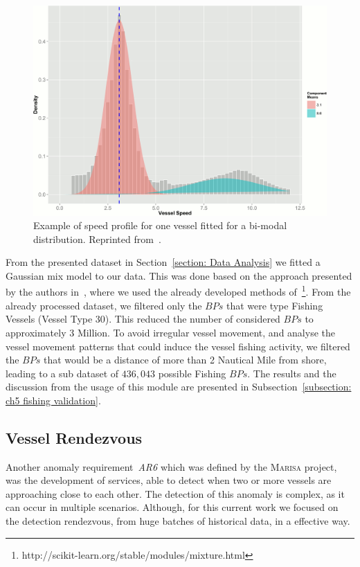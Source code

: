 \begin{figure}[H]
\centering
\includegraphics[scale = .7]{figures/Ch4/gmm_example.png}
\caption{Example of speed profile for one vessel fitted for a bi-modal distribution. Reprinted from~\cite{Natale2015MappingData}.}
\label{fig: 4 gmm_example}
\end{figure}

 
From the presented dataset in Section~\ref{section: Data Analysis} we fitted a Gaussian mix model to our data. This was done based on the approach presented by the authors in~\cite{Natale2015MappingData},  where we used the already developed methods of~\footnote{http://scikit-learn.org/stable/modules/mixture.html}. From the already  processed dataset, we filtered only the $BPs$ that were type Fishing Vessels (Vessel Type 30). This reduced the number of considered $BPs$ to approximately 3 Million. To avoid irregular vessel movement, and analyse the vessel movement patterns that could induce the vessel fishing activity, we filtered the $BPs$ that would be a distance of more than 2 Nautical Mile from shore, leading to a sub dataset of $436,043$ possible Fishing $BPs$.
The results and the discussion from the usage of this module are presented in Subsection~\ref{subsection: ch5 fishing validation}.

\subsection{Vessel Rendezvous}
\label{subsection: 4 Vessel Rendezvous}
Another anomaly requirement~\emph{AR6} which was defined by the \textsc{Marisa} project, was the development of services, able to detect when two or more vessels are approaching close to each other. The detection of this anomaly is complex, as it can occur in multiple scenarios. Although, for this current work we focused on the detection rendezvous, from huge batches of historical data, in a effective way. 

